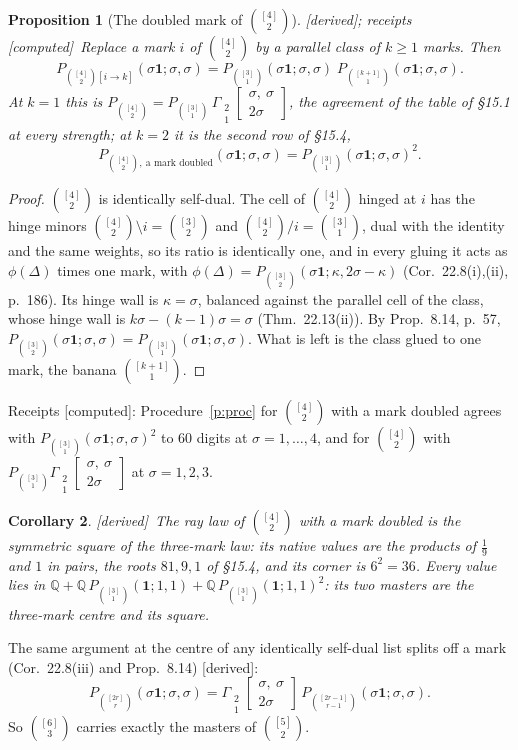 \documentclass[11pt]{article}
\newcommand{\one}{\mathbf 1}
\newcommand{\Gst}[4]{\Gamma_{\substack{#1\\#2}}\!\begin{bmatrix}#3\\#4\end{bmatrix}}
\theoremstyle{plain}
\newtheorem{proposition}{Proposition}[section]
\newtheorem{corollary}[proposition]{Corollary}
\theoremstyle{definition}
\theoremstyle{remark}
\newcommand{\derived}{\textup{[derived]}}
\newcommand{\computed}{\textup{[computed]}}
\begin{document}
\begin{proposition}[The doubled mark of $\binom{[4]}2$]\label{p:u24}\derived; receipts \computed\
Replace a mark $i$ of $\binom{[4]}2$ by a parallel class of $k\ge1$ marks. Then
\[
P_{\binom{[4]}2[i\to k]}(\sigma\one;\sigma,\sigma)=P_{\binom{[3]}1}(\sigma\one;\sigma,\sigma)\;P_{\binom{[k+1]}1}(\sigma\one;\sigma,\sigma).
\]
At $k=1$ this is $P_{\binom{[4]}2}=P_{\binom{[3]}1}\,\Gst21{\sigma,\ \sigma}{2\sigma}$, the agreement of the table of \S15.1 at every strength; at $k=2$ it is the second row of \S15.4,
\[
P_{\binom{[4]}2,\ \text{a mark doubled}}(\sigma\one;\sigma,\sigma)=P_{\binom{[3]}1}(\sigma\one;\sigma,\sigma)^2 .
\]
\end{proposition}

\begin{proof}
$\binom{[4]}2$ is identically self-dual. The cell of $\binom{[4]}2$ hinged at $i$ has the hinge minors $\binom{[4]}2\setminus i=\binom{[3]}2$ and $\binom{[4]}2/i=\binom{[3]}1$, dual with the identity and the same weights, so its ratio is identically one, and in every gluing it acts as $\phi(\Delta)$ times one mark, with $\phi(\Delta)=P_{\binom{[3]}2}(\sigma\one;\kappa,2\sigma-\kappa)$ (Cor.~22.8(i),(ii), p.~186). Its hinge wall is $\kappa=\sigma$, balanced against the parallel cell of the class, whose hinge wall is $k\sigma-(k-1)\sigma=\sigma$ (Thm.~22.13(ii)). By Prop.~8.14, p.~57, $P_{\binom{[3]}2}(\sigma\one;\sigma,\sigma)=P_{\binom{[3]}1}(\sigma\one;\sigma,\sigma)$. What is left is the class glued to one mark, the banana $\binom{[k+1]}1$.
\end{proof}

\noindent Receipts \computed: Procedure~\ref{p:proc} for $\binom{[4]}2$ with a mark doubled agrees with $P_{\binom{[3]}1}(\sigma\one;\sigma,\sigma)^2$ to $60$ digits at $\sigma=1,\dots,4$, and for $\binom{[4]}2$ with $P_{\binom{[3]}1}\Gst21{\sigma,\ \sigma}{2\sigma}$ at $\sigma=1,2,3$.

\begin{corollary}\label{c:u24}\derived\
The ray law of $\binom{[4]}2$ with a mark doubled is the symmetric square of the three-mark law: its native values are the products of $\frac19$ and $1$ in pairs, the roots $81,9,1$ of \S15.4, and its corner is $6^2=36$. Every value lies in $\mathbb Q+\mathbb Q\,P_{\binom{[3]}1}(\one;1,1)+\mathbb Q\,P_{\binom{[3]}1}(\one;1,1)^2$: its two masters are the three-mark centre and its square.
\end{corollary}

The same argument at the centre of any identically self-dual list splits off a mark (Cor.~22.8(iii) and Prop.~8.14) \derived:
\[
P_{\binom{[2r]}r}(\sigma\one;\sigma,\sigma)=\Gst21{\sigma,\ \sigma}{2\sigma}\,P_{\binom{[2r-1]}{r-1}}(\sigma\one;\sigma,\sigma).
\]
So $\binom{[6]}3$ carries exactly the masters of $\binom{[5]}2$.
\end{document}
